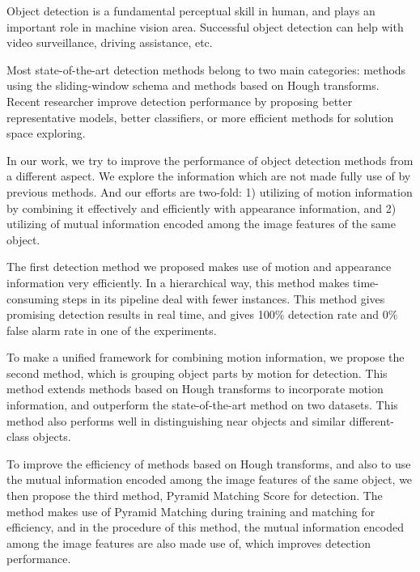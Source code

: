 \begin{eabstract}
\normalsize{
Object detection is a fundamental perceptual skill in human, and plays an important role in machine vision area. Successful object detection can help with video surveillance, driving assistance, etc.  

Most state-of-the-art detection methods belong to two main categories: methods using the sliding-window schema and methods based on Hough transforms. Recent researcher improve detection performance by proposing better representative models, better classifiers, or more efficient methods for  solution space exploring.


In our work, we try to improve the performance of object detection methods from a different aspect. We explore the information which are not made fully use of by previous methods. And our efforts are two-fold: 1) utilizing of motion information by combining it effectively and efficiently with appearance information, and 2) utilizing of mutual information encoded among the image features of the same object. 

The first detection method we proposed makes use of motion and appearance information very efficiently. In a hierarchical way, this method makes time-consuming steps in its pipeline deal with fewer instances. This method gives promising detection results in real time, and gives 100\% detection rate and 0\% false alarm rate in one of the experiments. 

To make a unified framework for combining motion information, we propose the second method, which is grouping object parts by motion for detection. This method extends methods based on Hough transforms to incorporate motion information, and outperform the state-of-the-art method on two datasets. This method also performs well in distinguishing near objects and similar different-class objects.

To improve the efficiency of methods based on Hough transforms, and also to use the mutual information encoded among the image features of the same object, we then propose the third method, Pyramid Matching Score for detection. The method makes use of Pyramid Matching during training and matching for efficiency, and in the procedure of this method, the mutual information encoded among the image features are also made use of, which improves detection performance.}
\newpage
\end{eabstract}



